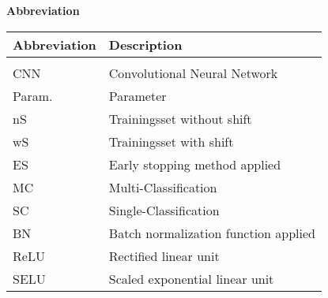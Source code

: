 \vspace{1cm}
\hspace{-0.5cm}
\textbf{{\Large Abbreviation}}
\begin{table}[h]
\centering
\begin{tabular}{p{3.8cm}p{4.8cm}}
\hline
Abbreviation  & Description \\ \hline
 & \\[-1mm]
CNN & Convolutional Neural Network \\[1.5mm]
Param. & Parameter \\[1.5mm]
nS & Trainingsset without shift \\[1.5mm]
wS & Trainingsset with shift \\[1.5mm]
ES & Early stopping method applied \\[1.5mm]
MC & Multi-Classification \\[1.5mm]
SC & Single-Classification \\[1.5mm]
BN & Batch normalization function applied \\[1.5mm]
ReLU & Rectified linear unit \\[1.5mm]
SELU & Scaled exponential linear unit \\[1.5mm]
\end{tabular}
\end{table}
\newpage
